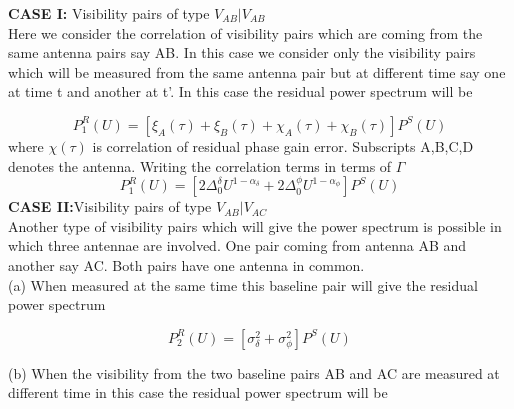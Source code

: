 \documentclass[fleqn,usenatbib]{mnras}
\begin{document}
\textbf{CASE I:} {Visibility pairs of type $V_{AB}|V_{AB}$} \\
Here we consider the correlation of visibility pairs which are coming from the same antenna pairs say AB. In this case we consider only the visibility pairs which will be measured from the same antenna pair but at different time say one at time t and another at t'. In this case the residual power spectrum will be

\begin{equation}
    P_1^R(U) = [\xi_A(\tau) + \xi_B(\tau) + \chi_A(\tau) +\chi_B(\tau) ]P^S(U)
\end{equation}
where $\chi(\tau)$ is correlation of residual phase gain error. Subscripts A,B,C,D denotes the antenna.
Writing the correlation terms in terms of $\Gamma$
\begin{equation}
      P_1^R(U) = [2\Delta^{\delta}_0 U^{1-\alpha_{\delta}}+ 2\Delta^{\phi}_0 U^{1-\alpha_{\phi}}]P^S(U)
 \end{equation}
\textbf{CASE II:}{Visibility pairs of type $V_{AB}|V_{AC}$}\\
Another type of visibility pairs which will give the power spectrum is possible in which three antennae are involved. One pair coming from antenna AB and another say AC. Both pairs have one antenna in common.\\
(a) When measured at the same time this baseline pair will give the residual power spectrum

\begin{equation}
    P_2^R(U) = [\sigma^2_{\delta} + \sigma^2_{\phi}]P^S(U)
\end{equation}

(b) When the visibility from the two baseline pairs AB and AC are measured at different time in this case the residual power spectrum will be
\end{document}
